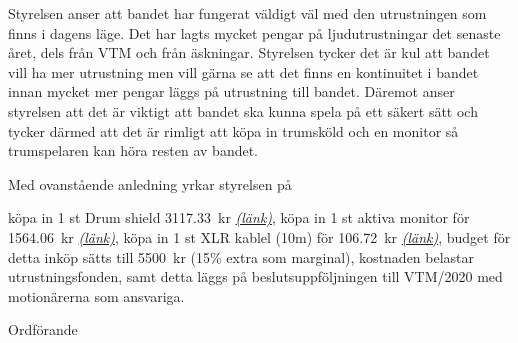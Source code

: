 \documentclass[../_main/handlingar.tex]{subfiles}
\begin{document}
\motionssvar

Styrelsen anser att bandet har fungerat väldigt väl med den utrustningen som finns i dagens läge. Det har lagts mycket pengar på ljudutrustningar det senaste året, dels från VTM och från äskningar. Styrelsen tycker det är kul att bandet vill ha mer utrustning men vill gärna se att det finns en kontinuitet i bandet innan mycket mer pengar läggs på utrustning till bandet. 
Däremot anser styrelsen att det är viktigt att bandet ska kunna spela på ett säkert sätt och tycker därmed att det är rimligt att köpa in trumsköld och en monitor så trumspelaren kan höra resten av bandet.


Med ovanstående anledning yrkar styrelsen på

\begin{attsatser}
    \att köpa in 1 st Drum shield \SI{3117.33}{kr} \href{https://www.thomann.de/se/the_t.akustik_ds4_4_drum_shield.htm}{\textit{(länk)}},
    \att köpa in 1 st aktiva monitor för \SI{1564.06}{kr} \href{https://www.thomann.de/se/behringer_f1220_eurolive.htm}{\textit{(länk)}},
    \att köpa in 1 st XLR kablel (10m) för \SI{106.72}{kr} \href{https://www.thomann.de/se/pro_snake_tpm_10.htm}{\textit{(länk)}},
    \att budget för detta inköp sätts till \SI{5500}{kr} (15\% extra som marginal),
    \att kostnaden belastar utrustningsfonden, samt
    \att detta läggs på beslutsuppföljningen till VTM/2020 med motionärerna som ansvariga.
\end{attsatser}

\begin{signatures}{1}
    \ist
    \signature{\ordf}{Ordförande}
\end{signatures}
\end{document}
